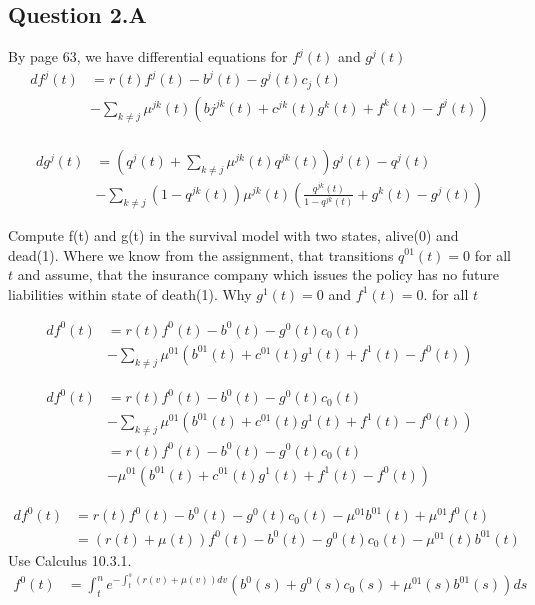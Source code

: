 \documentclass[10pt]{article}
\begin{document}
\subsection{Question 2.A}
By page 63, we have differential equations for $f^j(t)$ and $g^j(t)$
\begin{equation}
\begin{split}
df^j(t) & = r(t)f^j(t) - b^j(t) - g^j(t)c_j(t) 
\\ & - \sum_{k\neq j} \mu^{jk}(t) (bj^{jk}(t) + c^{jk}(t)g^k(t) + f^k(t) - f^j(t)) \\
\end{split}
\end{equation}

\begin{equation}
\begin{split}
dg^j(t) & = (q^j(t) + \sum_{k\neq j}
\mu^{jk}(t) q^{jk}(t)) g^j(t) -q^j(t) \\
& - \sum_{k\neq j}(1-q^{jk}(t))\mu^{jk}(t)(\frac{q^{jk}(t)}{1-q^{jk}(t)}+g^k(t)-g^j(t))
\end{split}
\end{equation}

Compute f(t) and g(t) in the survival model with two states, alive(0) and dead(1).
Where we know from the assignment, that transitions $q^{01}(t) = 0$ for all $t$ and assume, that the insurance company which issues the policy has no future liabilities within state of death(1). Why $g^1(t) = 0$ and $f^1(t) = 0$. for all $t$

\begin{equation}
\begin{split}
df^0(t) & = r(t)f^0(t) - b^0(t) - g^0(t)c_0(t) 
\\ & - \sum_{k\neq j} \mu^{01}(b^{01}(t) + c^{01}(t)g^1(t) + f^1(t) - f^0(t))
\end{split}
\end{equation}

\begin{equation}
\begin{split}
df^0(t) & = r(t)f^0(t) - b^0(t) - g^0(t)c_0(t) 
\\ & - \sum_{k\neq j} \mu^{01}(b^{01}(t) + c^{01}(t)g^1(t) + f^1(t) - f^0(t))
\\ & = r(t)f^0(t) - b^0(t) - g^0(t)c_0(t) 
\\ & - \mu^{01}(b^{01}(t) + c^{01}(t)g^1(t) + f^1(t) - f^0(t))
\end{split}
\end{equation}

\begin{equation}
\begin{split}
df^0(t) & = r(t)f^0(t) - b^0(t) - g^0(t)c_0(t) - \mu^{01}b^{01}(t) + \mu^{01}f^0(t)
\\ & = (r(t) + \mu(t))f^0(t) - b^0(t) - g^0(t)c_0(t) - \mu^{01}(t)b^{01}(t)
\end{split}
\end{equation}
Use Calculus 10.3.1.
\begin{equation}
\begin{split}
f^0(t) & = \int_t^n e^{-\int_t^s(r(v)+\mu(v))dv} (b^0(s) + g^0(s)c_0(s) + \mu^{01}(s)b^{01}(s))ds
\end{split}
\end{equation}
\end{document}
